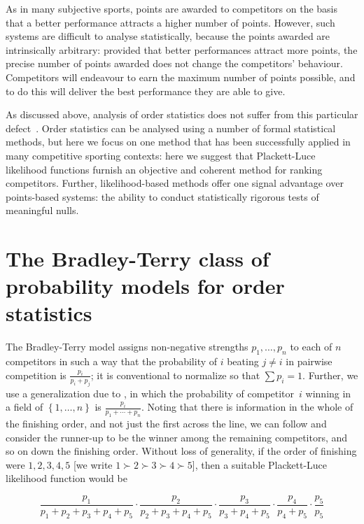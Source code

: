 \documentclass{article}
\begin{document}
As in many subjective sports, points are awarded to competitors on the
basis that a better performance attracts a higher number of points.
However, such systems are difficult to analyse statistically, because
the points awarded are intrinsically arbitrary: provided that better
performances attract more points, the precise number of points awarded
does not change the competitors' behaviour.  Competitors will
endeavour to earn the maximum number of points possible, and to do
this will deliver the best performance they are able to give.

As discussed above, analysis of order statistics does not suffer from
this particular defect~\citep{aldous2017}.  Order statistics can be
analysed using a number of formal statistical methods, but here we
focus on one method that has been successfully applied in many
competitive sporting contexts: here we suggest that Plackett-Luce
likelihood functions furnish an objective and coherent method for
ranking competitors.  Further, likelihood-based methods offer one
signal advantage over points-based systems: the ability to conduct
statistically rigorous tests of meaningful nulls.

\section{The Bradley-Terry class of probability models for order statistics}

The Bradley-Terry model \citep{bradley1954} assigns non-negative
strengths $p_1,\ldots, p_n$ to each of $n$ competitors in such a way
that the probability of $i$ beating $j\neq i$ in pairwise competition
is $\frac{p_i}{p_i+p_j}$; it is conventional to normalize so that
$\sum p_i=1$.  Further, we use a generalization due to
\citet{luce1959}, in which the probability of competitor~$i$ winning
in a field of $\left\lbrace 1,\ldots, n\right\rbrace$ is
$\frac{p_i}{p_1+\cdots +p_n}$.  Noting that there is information in
the whole of the finishing order, and not just the first across the
line, we can follow \citet{plackett1975} and consider the runner-up to
be the winner among the remaining competitors, and so on down the
finishing order. Without loss of generality, if the order of finishing
were $1,2,3,4,5$ [we write $1\succ 2\succ 3\succ 4\succ5$], then a
suitable Plackett-Luce likelihood function would be

\begin{equation}\label{competitors_1_to_5_likelihood}
\frac{p_1}{p_1+p_2+p_3+p_4+p_5}\cdot
\frac{p_2}{p_2+p_3+p_4+p_5}\cdot
\frac{p_3}{p_3+p_4+p_5}\cdot
\frac{p_4}{p_4+p_5}\cdot
\frac{p_5}{p_5}
\end{equation}
\end{document}
